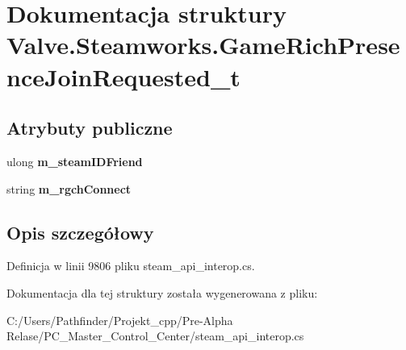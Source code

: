 \hypertarget{struct_valve_1_1_steamworks_1_1_game_rich_presence_join_requested__t}{}\section{Dokumentacja struktury Valve.\+Steamworks.\+Game\+Rich\+Presence\+Join\+Requested\+\_\+t}
\label{struct_valve_1_1_steamworks_1_1_game_rich_presence_join_requested__t}
\subsection*{Atrybuty publiczne}
\begin{DoxyCompactItemize}
\item 
\mbox{\label{struct_valve_1_1_steamworks_1_1_game_rich_presence_join_requested__t_a5166deca1915c29bab44603367ee31fe}} 
ulong {\bfseries m\+\_\+steam\+I\+D\+Friend}
\item 
\mbox{\label{struct_valve_1_1_steamworks_1_1_game_rich_presence_join_requested__t_a4c40e78449b72c27cba5d90dcfe06b04}} 
string {\bfseries m\+\_\+rgch\+Connect}
\end{DoxyCompactItemize}


\subsection{Opis szczegółowy}


Definicja w linii 9806 pliku steam\+\_\+api\+\_\+interop.\+cs.



Dokumentacja dla tej struktury została wygenerowana z pliku\+:\begin{DoxyCompactItemize}
\item 
C\+:/\+Users/\+Pathfinder/\+Projekt\+\_\+cpp/\+Pre-\/\+Alpha Relase/\+P\+C\+\_\+\+Master\+\_\+\+Control\+\_\+\+Center/steam\+\_\+api\+\_\+interop.\+cs\end{DoxyCompactItemize}
